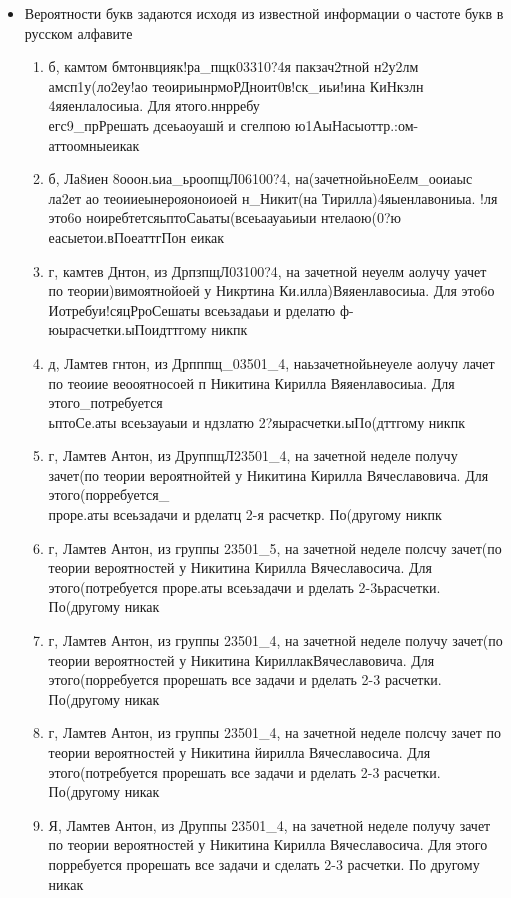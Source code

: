 \begin{itemize}
	\item Вероятности букв задаются исходя из известной информации о частоте букв в русском алфавите	
	
	\begin{enumerate}
		\item
		б, камтом бмтонвцияк!ра\_пщк03310?4я пакзач2тной н2у2лм амсп1у(ло2еу!ао теоириынрмоРДноит0в!ск\_иьи!ина КиНкзлн 4яяенлалосиыа. Для ятого.ннрребу\\егс9\_прРрешать дсеьаоуашй и сгелпою ю1АыНасыоттр.:ом-аттоомныеикак
		\item
		б, Ла8иен 8ооон.ьиа\_ьроопщЛ06100?4, на(зачетнойьноЕелм\_ооиаыс ла2ет ао теоииеынерояоноиоей н\_Никит(на Тирилла)4яыенлавониыа. !ля это6о ноиребтетсяьптоСаьаты(всеьаауаьиыи нтелаою(0?ю еасыетои.вПоеаттгПон еикак
		\item
		г, камтев Днтон, из ДрпзпщЛ03100?4, на зачетной неуелм аолучу уачет по теории)вимоятнойоей у Никртина Ки.илла)Вяяенлавосиыа. Для это6о Иотребуи!сяцРроСешаты всеьзадаьи и рделатю ф-юырасчетки.ыПоидттгому никпк
		\item
		д, Ламтев гнтон, из Дрпппщ\_03501\_4, наьзачетнойьнеуеле аолучу лачет по теоиие веооятносоей п Никитина Кирилла Вяяенлавосиыа. Для этого\_потребуется\\ьптоСе.аты всеьзауаыи и ндзлатю 2?яырасчетки.ыПо(дттгому никпк
		\item
		г, Ламтев Антон, из ДруппщЛ23501\_4, на зачетной неделе получу зачет(по теории вероятнойтей у Никитина Кирилла Вячеславовича. Для этого(порребуется\_\\проре.аты всеьзадачи и рделатц 2-я расчеткр. По(другому никпк
		\item
		г, Ламтев Антон, из группы 23501\_5, на зачетной неделе полсчу зачет(по теории вероятностей у Никитина Кирилла Вячеславосича. Для этого(потребуется проре.аты всеьзадачи и рделать 2-3ьрасчетки. По(другому никак
		\item
		г, Ламтев Антон, из группы 23501\_4, на зачетной неделе получу зачет(по теории вероятностей у Никитина КириллакВячеславовича. Для этого(порребуется прорешать все задачи и рделать 2-3 расчетки. По(другому никак
		\item
		г, Ламтев Антон, из группы 23501\_4, на зачетной неделе полсчу зачет по теории вероятностей у Никитина йирилла Вячеславосича. Для этого(потребуется прорешать все задачи и рделать 2-3 расчетки. По(другому никак
		\item
		Я, Ламтев Антон, из Друппы 23501\_4, на зачетной неделе получу зачет по теории вероятностей у Никитина Кирилла Вячеславосича. Для этого порребуется прорешать все задачи и сделать 2-3 расчетки. По другому никак

\end{enumerate}
\end{itemize}
